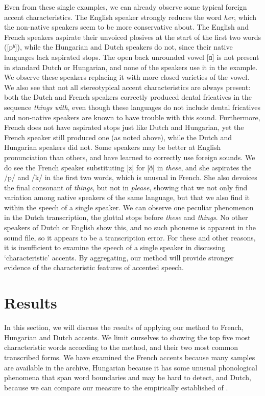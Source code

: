 \documentclass[output=paper]{LSP/langsci}
\begin{document}
Even from these single examples, we can already observe some typical foreign accent characteristics. The English speaker strongly reduces the word \textit{her}, which the non-native speakers seem to be more conservative about. The English and French speakers aspirate their unvoiced plosives at the start of the first two words ([pʰ]), while the Hungarian and Dutch speakers do not, since their native languages lack aspirated stops. The open back unrounded vowel [ɑ] is not present in standard Dutch or Hungarian, and none of the speakers use it in the example. We observe these speakers replacing it with more closed varieties of the vowel. We also see that not all stereotypical accent characteristics are always present: both the Dutch and French speakers correctly produced dental fricatives in the sequence \textit{things with}, even though these languages do not include dental fricatives and non-native speakers are known to have trouble with this sound. Furthermore, French does not have aspirated stops just like Dutch and Hungarian, yet the French speaker still produced one (as noted above), while the Dutch and Hungarian speakers did not. Some speakers may be better at English pronunciation than others, and have learned to correctly use foreign sounds. We do see the French speaker substituting [z] for [ð] in \textit{these}, and she aspirates the /p/ and /k/ in the first two words, which is unusual in French. She also devoices the final consonant of \textit{things}, but not in \textit{please}, showing that we not only find variation among native speakers of the same language, but that we also find it within the speech of a single speaker. We can observe one peculiar phenomenon in the Dutch transcription, the glottal stops before \textit{these} and \textit{things}. No other speakers of Dutch or English show this, and no such phoneme is apparent in the sound file, so it appears to be a transcription error. For these and other reasons, it is insufficient to examine the speech of a single speaker in discussing `characteristic' accents. By aggregating, our method will provide stronger evidence of the characteristic features of accented speech.

\section{Results}
\label{s:results}

In this section, we will discuss the results of applying our method to French, Hungarian and Dutch accents. We limit ourselves to showing the top five most characteristic words according to the method, and their two most common transcribed forms. We have examined the French accents because many samples are available in the archive, Hungarian because it has some unusual phonological phenomena that span word boundaries and may be hard to detect, and Dutch, because we can compare our measure to the empirically established  of \citet{van_den_doel_evaluation_2006}.
\end{document}
